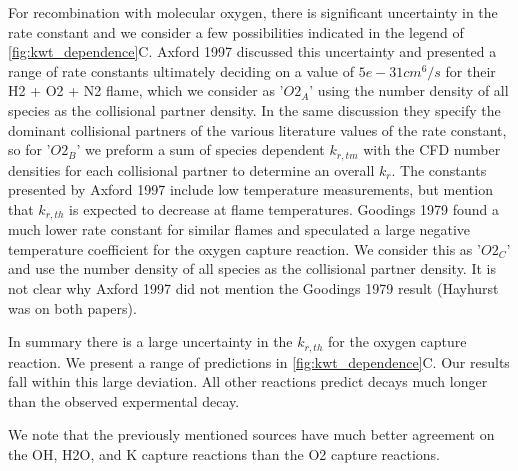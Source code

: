 For recombination with molecular oxygen, there is significant uncertainty in the rate constant and we consider a few possibilities indicated in the legend of \ref{fig:kwt_dependence}C. Axford 1997 discussed this uncertainty and presented a range of rate constants ultimately deciding on a value of $5e-31 cm^6/s$ for their H2 + O2 + N2 flame, which we consider as '$O2_A$' using the number density of all species as the collisional partner density. In the same discussion they specify the dominant collisional partners of the various literature values of the rate constant, so for '$O2_B$' we preform a sum of species dependent $k_{r,tm}$ with the CFD number densities for each collisional partner to determine an overall $k_r$. The constants presented by Axford 1997 include low temperature measurements, but mention that $k_{r,th}$ is expected to decrease at flame temperatures. Goodings 1979 found a much lower rate constant for similar flames and speculated a large negative temperature coefficient for the oxygen capture reaction. We consider this as '$O2_C$' and use the number density of all species as the collisional partner density. It is not clear why Axford 1997 did not mention the Goodings 1979 result (Hayhurst was on both papers). 

In summary there is a large uncertainty in the $k_{r,th}$ for the oxygen capture reaction. We present a range of predictions in \ref{fig:kwt_dependence}C. Our results fall within this large deviation. All other reactions predict decays much longer than the observed expermental decay. 

We note that the previously mentioned sources have much better agreement on the OH, H2O, and K capture reactions than the O2 capture reactions. 



